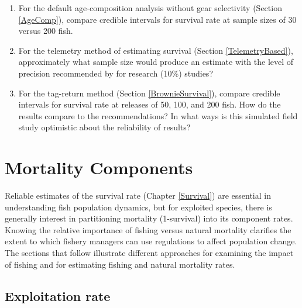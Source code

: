 \documentclass[
]{krantz}
\begin{document}
\begin{enumerate}
\def\labelenumi{\arabic{enumi}.}
\item
  For the default age-composition analysis without gear selectivity (Section \ref{AgeComp}), compare credible intervals for survival rate at sample sizes of 30 versus 200 fish.
\item
  For the telemetry method of estimating survival (Section \ref{TelemetryBased}), approximately what sample size would produce an estimate with the level of precision recommended by \citet{robson.regier_1964} for research (10\%) studies?
\item
  For the tag-return method (Section \ref{BrownieSurvival}), compare credible intervals for survival rate at releases of 50, 100, and 200 fish. How do the results compare to the \citet{robson.regier_1964} recommendations? In what ways is this simulated field study optimistic about the reliability of results?
\end{enumerate}

\hypertarget{Mortality}{%
\chapter{Mortality Components}\label{Mortality}}

Reliable estimates of the survival rate (Chapter \ref{Survival}) are essential in understanding fish population dynamics, but for exploited species, there is generally interest in partitioning mortality (1-survival) into its component rates. Knowing the relative importance of fishing versus natural mortality clarifies the extent to which fishery managers can use regulations to affect population change. The sections that follow illustrate different approaches for examining the impact of fishing and for estimating fishing and natural mortality rates.

\hypertarget{ExpRate}{%
\section{Exploitation rate}\label{ExpRate}}
\end{document}
